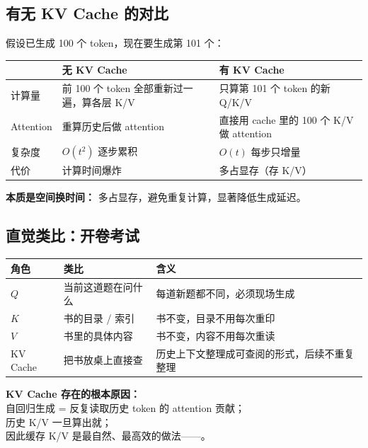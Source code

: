 \subsection{有无 KV Cache 的对比}

假设已生成 100 个 token，现在要生成第 101 个：

\begin{center}
{\small
\begin{tabular}{p{3cm}p{5cm}p{5cm}}
\hline
 & \textbf{无 KV Cache} & \textbf{有 KV Cache} \\
\hline
计算量 & 前 100 个 token 全部重新过一遍，算各层 K/V & 只算第 101 个 token 的新 Q/K/V \\
Attention & 重算历史后做 attention & 直接用 cache 里的 100 个 K/V 做 attention \\
复杂度 & $O(t^2)$ 逐步累积 & $O(t)$ 每步只增量 \\
代价 & 计算时间爆炸 & 多占显存（存 K/V） \\
\hline
\end{tabular}
}
\end{center}

\begin{intubox}
\textbf{本质是空间换时间：} 多占显存，避免重复计算，显著降低生成延迟。
\end{intubox}

\subsection{直觉类比：开卷考试}

\begin{center}
{\small
\begin{tabular}{p{2cm}p{5cm}p{6cm}}
\hline
\textbf{角色} & \textbf{类比} & \textbf{含义} \\
\hline
$Q$ & 当前这道题在问什么 & 每道新题都不同，必须现场生成 \\
$K$ & 书的目录 / 索引 & 书不变，目录不用每次重印 \\
$V$ & 书里的具体内容 & 书不变，内容不用每次重读 \\
KV Cache & 把书放桌上直接查 & 历史上下文整理成可查阅的形式，后续不重复整理 \\
\hline
\end{tabular}
}
\end{center}

\begin{summarybox}
\textbf{KV Cache 存在的根本原因：}\\
自回归生成 = 反复读取历史 token 的 attention 贡献；\\
历史 K/V 一旦算出就；\\
因此缓存 K/V 是最自然、最高效的做法——。
\end{summarybox}

